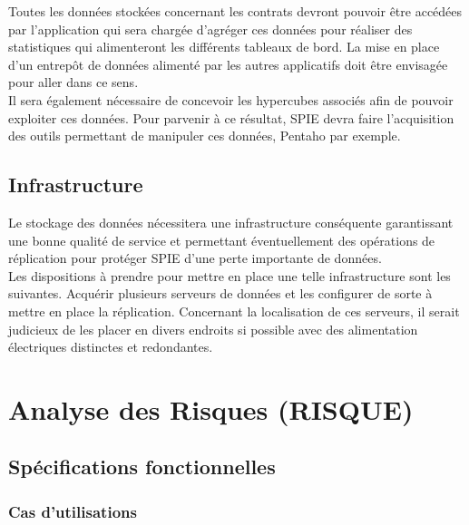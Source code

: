 Toutes les données stockées concernant les contrats devront pouvoir être accédées par l’application qui sera chargée d’agréger ces données pour réaliser des statistiques qui alimenteront les différents tableaux de bord. La mise en place d’un entrepôt de données alimenté par les autres applicatifs doit être envisagée pour aller dans ce sens. \\

Il sera également nécessaire de concevoir les hypercubes associés afin de pouvoir exploiter ces données. Pour parvenir à ce résultat, SPIE devra faire l’acquisition des outils permettant de manipuler ces données, Pentaho par exemple. 

\subsection{Infrastructure}

Le stockage des données nécessitera une infrastructure conséquente garantissant une bonne qualité de service et permettant éventuellement des opérations de réplication pour protéger SPIE d’une perte importante de données. \\

Les dispositions à prendre pour mettre en place une telle infrastructure sont les suivantes. Acquérir plusieurs serveurs de données et les configurer de sorte à mettre en place la réplication. Concernant la localisation de ces serveurs, il serait judicieux de les placer en divers endroits si possible avec des alimentation électriques distinctes et redondantes. 

\section{Analyse des Risques (RISQUE)}%

\subsection{Spécifications fonctionnelles}

\subsubsection{Cas d’utilisations}


